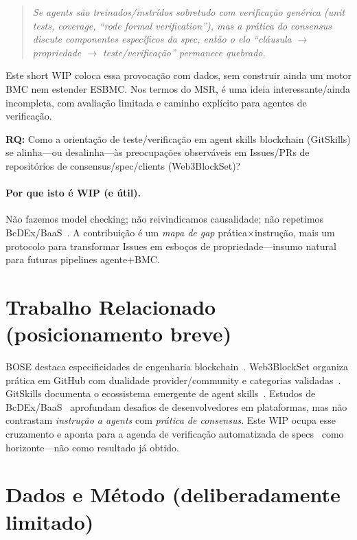 \documentclass[10pt,conference]{IEEEtran}
\begin{document}
\begin{quote}
\emph{Se agents são treinados/instrídos sobretudo com verificação genérica (unit tests, coverage, ``rode formal verification''), mas a prática do consensus discute componentes específicos da spec, então o elo ``cláusula $\rightarrow$ propriedade $\rightarrow$ teste/verificação'' permanece quebrado.}
\end{quote}

Este short WIP coloca essa provocação com dados, sem construir ainda um motor BMC nem estender ESBMC. Nos termos do MSR, é uma ideia interessante/ainda incompleta, com avaliação limitada e caminho explícito para agentes de verificação.

\textbf{RQ:} Como a orientação de teste/verificação em agent skills blockchain (GitSkills) se alinha---ou desalinha---às preocupações observáveis em Issues/PRs de repositórios de consensus/spec/clients (Web3BlockSet)?

\paragraph{Por que isto é WIP (e útil).}
Não fazemos model checking; não reivindicamos causalidade; não repetimos BcDEx/BaaS~\cite{soares2025bcdex}. A contribuição é um \emph{mapa de gap} prática$\times$instrução, mais um protocolo para transformar Issues em esboços de propriedade---insumo natural para futuras pipelines agente+BMC.

\section{Trabalho Relacionado (posicionamento breve)}

BOSE destaca especificidades de engenharia blockchain~\cite{porru2017bose}. Web3BlockSet organiza prática em GitHub com dualidade provider/community e categorias validadas~\cite{soares2026web3blockset}. GitSkills documenta o ecossistema emergente de agent skills~\cite{gitskills2026}. Estudos de BcDEx/BaaS~\cite{soares2025bcdex} aprofundam desafios de desenvolvedores em plataformas, mas não contrastam \emph{instrução a agents} com \emph{prática de consensus}. Este WIP ocupa esse cruzamento e aponta para a agenda de verificação automatizada de specs~\cite{consensusSpecs,clarke2018bmc} como horizonte---não como resultado já obtido.

\section{Dados e Método (deliberadamente limitado)}
\end{document}
